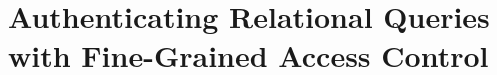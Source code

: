 \chapter{Authenticating Relational Queries with Fine-Grained Access Control}\label{chap:access-control}
